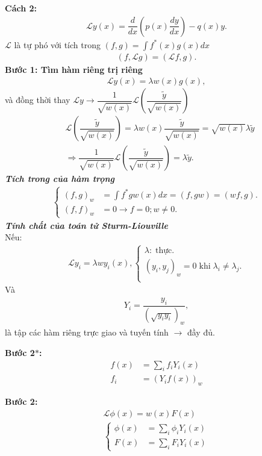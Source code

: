 \documentclass{report}
\newcommand{\s}{\ast}
\newcommand{\dps}{\displaystyle}
\newcommand{\f}[2]{\dfrac{#1}{#2}}
\begin{document}
\textbf{Cách 2:}
\begin{align*}
	\mathcal{L}y(x) = \f{d}{dx}\left(p(x)\f{dy}{dx}\right) - q(x)y.
\end{align*}
$\mathcal{L}$ là tự phó với tích trong $(f,g) = \dps\int f^{\s}(x) g(x) dx$
\begin{align*}
	\left(f,\mathcal{L}g\right) = \left(\mathcal{L}f,g\right).
\end{align*}
\textbf{Bước 1: Tìm hàm riêng trị riêng}
\begin{align*}
	\mathcal{L}y(x) = \lambda w(x)g(x),
\end{align*}
và đồng thời thay $\mathcal{L}y \rightarrow \f{1}{\sqrt{w(x)}} \mathcal{L}(\f{\tilde{y}}{\sqrt{w(x)}})$
\begin{align*}
	 & \mathcal{L}\left(\f{\tilde{y}}{\sqrt{w(x)}}\right) = \lambda w(x) \f{\tilde{y}}{\sqrt{w(x)}} = \sqrt{w(x)}\lambda\tilde{y} \\
	 & \Rightarrow \f{1}{\sqrt{w(x)}}\mathcal{L}\left(\f{\tilde{y}}{\sqrt{w(x)}}\right) = \lambda \tilde{y}.
\end{align*}
\textit{\textbf{Tích trong của hàm trọng}}
\begin{align*}
	\begin{cases}
		(f,g)_w & = \int f^{\s} g w(x)dx = (f,gw) = (wf,g) .\\
		(f,f)_w & = 0 \rightarrow f = 0;w \neq 0  .
	\end{cases}
\end{align*}
\textit{ \textbf{Tính chất của toán tử Sturm-Liouville}}\\
Nếu:
\begin{align*}
	\mathcal{L} y_i = \lambda w y_i(x),
	\begin{cases}
		\lambda:\;\text{thực}. \\
		\left(y_i,y_j\right)_w = 0\;\text{khi}\; \lambda_i \neq \lambda_j. \\
	\end{cases}
\end{align*}
Và
\begin{align*}
	Y_i = \f{y_i}{(\sqrt{y_i y_i})_w},
\end{align*}
là tập các hàm riêng trực giao và tuyến tính $\rightarrow$ đầy đủ.

\textbf{Bước 2$\s$:}
\begin{align*}
	f(x) &= \sum_{i} f_i Y_i(x)\\
	f_i &= (Y_i f(x))_w
\end{align*}

\textbf{Bước 2:}
\begin{align*}
	\mathcal{L} \phi(x) = w(x) F(x)\\
	\begin{cases}
		\phi(x) & = \dps\sum_{i}\phi_i Y_i(x)\\
		F(x) & = \dps\sum_{i}F_i Y_i(x)
	\end{cases}
\end{align*}
\end{document}
